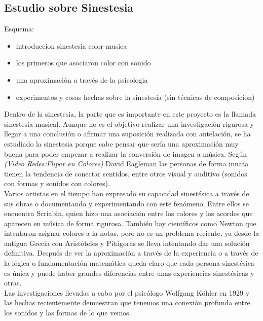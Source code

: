 \subsection{Estudio sobre Sinestesia}
\label{subsubsec:estudioSinestesia}

Esquema:
\begin{itemize}
\item introduccion sinestesia color-musica
\item los primeros que asociaron color con sonido
\item una aproximación a través de la psicologia
\item experimentos y cosas hechas sobre la sinestesia (sin técnicas de composicion)
\end{itemize}

Dentro de la sinestesia, la parte que es importante en este proyecto es la llamada sinestesia musical. Aunque no es el objetivo realizar una investigación rigurosa y llegar a una conclusión o afirmar una suposición realizada con antelación, se ha estudiado la sinestesia porque cabe pensar que sería una aproximación muy buena para poder empezar a realizar la conversión de imagen a música.
Según \emph{(Video Redes:Flipar en Colores)} David Eagleman las personas de forma innata tienen la tendencia de conectar sentidos, entre otros visual y auditivo (sonidos con formas y sonidos con colores).\\

Varios artistas en el tiempo han expresado su capacidad sinestésica a través de sus obras o documentando y experimentando con este fenómeno. Entre ellos se encuentra Scriabin, quien hizo una asociación entre los colores y los acordes que aparecen en música de forma rigurosa. También hay científicos como Newton que intentaron asignar colores a la notas, pero no es un problema reciente, ya desde la antigua Grecia con Aristóteles y Pitágoras se lleva intentando dar una solución definitiva. Después de ver la aproximación a través de la experiencia o a través de la lógica o fundamentación matemática queda claro que cada persona sinestésica es única y puede haber grandes diferencias entre unas experiencias sinestésicas y otras.\\

Las investigaciones llevadas a cabo por el psicólogo Wolfgang Köhler en 1929 y las hechas recientemente demuestran que tenemos una conexión profunda entre los sonidos y las formas de lo que vemos. 


